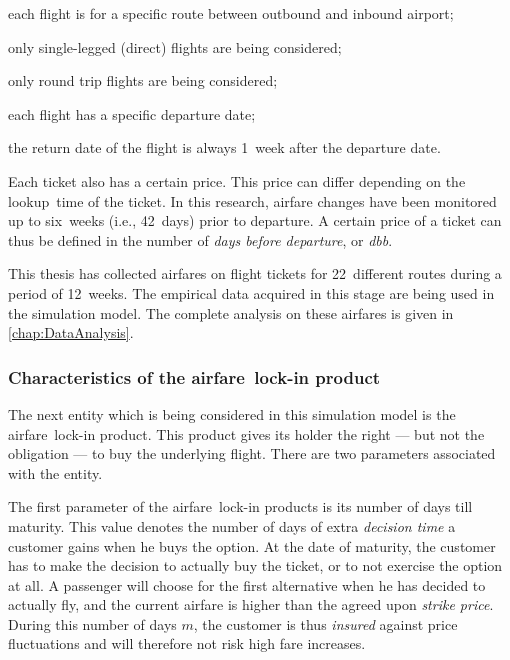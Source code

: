 \begin{compactitem}
\item each flight is for a specific route between outbound and inbound airport;
\item only single-legged (direct) flights are being considered;
\item only round trip flights are being considered;
\item each flight has a specific departure date;
\item the return date of the flight is always 1~week after the departure date.
\end{compactitem}

\vspace{1em}

Each ticket also has a certain price. This price can differ depending on the lookup~time of the ticket. In this research, airfare changes have been monitored up to six~weeks (i.e., 42~days) prior to departure. A certain price of a ticket can thus be defined in the number of \emph{days before departure}, or \emph{dbb}.

This thesis has collected airfares on flight tickets for 22~different routes during a period of 12~weeks. The empirical data acquired in this stage are being used in the simulation model. The complete analysis on these airfares is given in \autoref{chap:DataAnalysis}.

\subsubsection{Characteristics of the airfare~lock-in product}
The next entity which is being considered in this simulation model is the airfare~lock-in product. This product gives its holder the right --- but not the obligation --- to buy the underlying flight. There are two parameters associated with the entity.

The first parameter of the airfare~lock-in products is its number of days till maturity. This value denotes the number of days of extra \emph{decision time} a customer gains when he buys the option. At the date of maturity, the customer has to make the decision to actually buy the ticket, or to not exercise the option at all. A passenger will choose for the first alternative when he has decided to actually fly, and the current airfare is higher than the agreed upon \emph{strike price}. During this number of days $m$, the customer is thus \emph{insured} against price fluctuations and will therefore not risk high fare increases.

